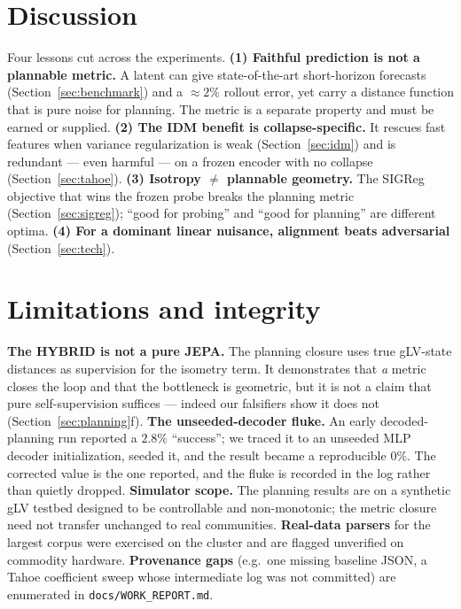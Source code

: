 \documentclass[11pt]{article}
\newcommand{\code}[1]{\texttt{#1}}
\begin{document}
\section{Discussion}
Four lessons cut across the experiments.
\textbf{(1) Faithful prediction is not a plannable metric.} A latent can give
state-of-the-art short-horizon forecasts (Section~\ref{sec:benchmark}) and a
$\approx2\%$ rollout error, yet carry a distance function that is pure noise for
planning. The metric is a separate property and must be earned or supplied.
\textbf{(2) The IDM benefit is collapse-specific.} It rescues fast features when
variance regularization is weak (Section~\ref{sec:idm}) and is redundant ---
even harmful --- on a frozen encoder with no collapse (Section~\ref{sec:tahoe}).
\textbf{(3) Isotropy $\neq$ plannable geometry.} The SIGReg objective that wins
the frozen probe breaks the planning metric (Section~\ref{sec:sigreg}); ``good
for probing'' and ``good for planning'' are different optima.
\textbf{(4) For a dominant linear nuisance, alignment beats adversarial}
(Section~\ref{sec:tech}).

\section{Limitations and integrity}
\label{sec:integrity}
\textbf{The HYBRID is not a pure JEPA.} The planning closure uses true
gLV-state distances as supervision for the isometry term. It demonstrates that
\emph{a} metric closes the loop and that the bottleneck is geometric, but it is
not a claim that pure self-supervision suffices --- indeed our falsifiers show it
does not (Section~\ref{sec:planning}f). \textbf{The unseeded-decoder fluke.} An
early decoded-planning run reported a $2.8\%$ ``success''; we traced it to an
unseeded MLP decoder initialization, seeded it, and the result became a
reproducible $0\%$. The corrected value is the one reported, and the fluke is
recorded in the log rather than quietly dropped. \textbf{Simulator scope.} The
planning results are on a synthetic gLV testbed designed to be controllable and
non-monotonic; the metric closure need not transfer unchanged to real
communities. \textbf{Real-data parsers} for the largest corpus were exercised on
the cluster and are flagged unverified on commodity hardware. \textbf{Provenance
gaps} (e.g.\ one missing baseline JSON, a Tahoe coefficient sweep whose
intermediate log was not committed) are enumerated in \code{docs/WORK\_REPORT.md}.
\end{document}
